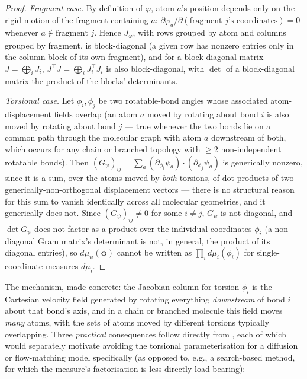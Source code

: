 \documentclass[11pt,a4paper]{report}
\theoremstyle{definition}
\theoremstyle{remark}
\begin{document}
\begin{proof}
\emph{Fragment case.} By definition of $\varphi$, atom $a$'s position
depends only on the rigid motion of the fragment containing $a$:
$\partial\varphi_a/\partial(\text{fragment }j\text{'s coordinates})=0$
whenever $a\notin\text{fragment }j$. Hence $J_\varphi$, with rows grouped
by atom and columns grouped by fragment, is block-diagonal (a given row has
nonzero entries only in the column-block of its own fragment), and for a
block-diagonal matrix $J=\bigoplus_iJ_i$, $J^\top J=\bigoplus_iJ_i^\top J_i$
is also block-diagonal, with $\det$ of a block-diagonal matrix the product
of the blocks' determinants.

\emph{Torsional case.} Let $\phi_i,\phi_j$ be two rotatable-bond angles
whose associated atom-displacement fields overlap (an atom $a$ moved by
rotating about bond $i$ is also moved by rotating about bond $j$ --- true
whenever the two bonds lie on a common path through the molecular graph
with atom $a$ downstream of both, which occurs for any chain or branched
topology with $\ge2$ non-independent rotatable bonds). Then
$(G_\psi)_{ij}=\sum_a(\partial_{\phi_i}\psi_a)\cdot(\partial_{\phi_j}\psi_a)$
is generically nonzero, since it is a sum, over the atoms moved by
\emph{both} torsions, of dot products of two generically-non-orthogonal
displacement vectors --- there is no structural reason for this sum to
vanish identically across all molecular geometries, and it generically does
not. Since $(G_\psi)_{ij}\ne0$ for some $i\ne j$, $G_\psi$ is not diagonal,
and $\det G_\psi$ does not factor as a product over the individual
coordinates $\phi_i$ (a non-diagonal Gram matrix's determinant is not, in
general, the product of its diagonal entries), so $d\mu_\psi(\bm\phi)$
cannot be written as $\prod_id\mu_i(\phi_i)$ for single-coordinate
measures $d\mu_i$.
\end{proof}

The mechanism, made concrete: the Jacobian column for torsion $\phi_i$ is
the Cartesian velocity field generated by rotating everything
\emph{downstream} of bond $i$ about that bond's axis, and in a chain or
branched molecule this field moves \emph{many} atoms, with the sets of
atoms moved by different torsions typically overlapping. Three
\emph{practical} consequences follow directly from
, each of which would separately motivate
avoiding the torsional parameterisation for a diffusion or flow-matching
model specifically (as opposed to, e.g., a search-based method, for which
the measure's factorisation is less directly load-bearing):
\end{document}
